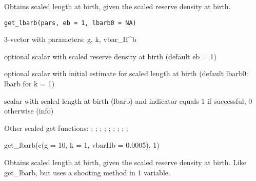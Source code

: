 \documentclass[a4paper]{book}
\begin{document}
%
\begin{Description}\relax
Obtains scaled length at birth, given the scaled reserve density at birth.
\end{Description}
%
\begin{Usage}
\begin{verbatim}
get_lbarb(pars, eb = 1, lbarb0 = NA)
\end{verbatim}
\end{Usage}
%
\begin{Arguments}
\begin{ldescription}
\item[\code{pars}] 3-vector with parameters: g, k, vbar\_H\textasciicircum{}b

\item[\code{eb}] optional scalar with scaled reserve density at birth (default eb = 1)

\item[\code{lbarb0}] optional scalar with initial estimate for scaled length at birth (default lbarb0: lbarb for k = 1)
\end{ldescription}
\end{Arguments}
%
\begin{Value}
scalar with scaled length at birth (lbarb) and indicator equals 1 if successful, 0 otherwise (info)
\end{Value}
%
\begin{SeeAlso}\relax
Other scaled get functions: ;
; ;
; ;
; ;
;
;
\end{SeeAlso}
%
\begin{Examples}
\begin{ExampleCode}
get_lbarb(c(g = 10, k = 1, vbarHb = 0.0005), 1)
\end{ExampleCode}
\end{Examples}
%
\begin{Description}\relax
Obtains scaled length at birth, given the scaled reserve density at birth. Like get\_lbarb, but uses a shooting method in 1 variable.
\end{Description}
\end{document}
